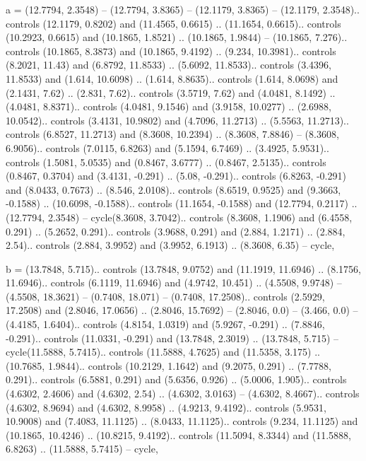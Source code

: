 a = {(12.7794, 2.3548) -- (12.7794, 3.8365) -- (12.1179, 3.8365) -- (12.1179, 2.3548).. controls (12.1179, 0.8202) and (11.4565, 0.6615) .. (11.1654, 0.6615).. controls (10.2923, 0.6615) and (10.1865, 1.8521) .. (10.1865, 1.9844) -- (10.1865, 7.276).. controls (10.1865, 8.3873) and (10.1865, 9.4192) .. (9.234, 10.3981).. controls (8.2021, 11.43) and (6.8792, 11.8533) .. (5.6092, 11.8533).. controls (3.4396, 11.8533) and (1.614, 10.6098) .. (1.614, 8.8635).. controls (1.614, 8.0698) and (2.1431, 7.62) .. (2.831, 7.62).. controls (3.5719, 7.62) and (4.0481, 8.1492) .. (4.0481, 8.8371).. controls (4.0481, 9.1546) and (3.9158, 10.0277) .. (2.6988, 10.0542).. controls (3.4131, 10.9802) and (4.7096, 11.2713) .. (5.5563, 11.2713).. controls (6.8527, 11.2713) and (8.3608, 10.2394) .. (8.3608, 7.8846) -- (8.3608, 6.9056).. controls (7.0115, 6.8263) and (5.1594, 6.7469) .. (3.4925, 5.9531).. controls (1.5081, 5.0535) and (0.8467, 3.6777) .. (0.8467, 2.5135).. controls (0.8467, 0.3704) and (3.4131, -0.291) .. (5.08, -0.291).. controls (6.8263, -0.291) and (8.0433, 0.7673) .. (8.546, 2.0108).. controls (8.6519, 0.9525) and (9.3663, -0.1588) .. (10.6098, -0.1588).. controls (11.1654, -0.1588) and (12.7794, 0.2117) .. (12.7794, 2.3548) -- cycle(8.3608, 3.7042).. controls (8.3608, 1.1906) and (6.4558, 0.291) .. (5.2652, 0.291).. controls (3.9688, 0.291) and (2.884, 1.2171) .. (2.884, 2.54).. controls (2.884, 3.9952) and (3.9952, 6.1913) .. (8.3608, 6.35) -- cycle},

b = {(13.7848, 5.715).. controls (13.7848, 9.0752) and (11.1919, 11.6946) .. (8.1756, 11.6946).. controls (6.1119, 11.6946) and (4.9742, 10.451) .. (4.5508, 9.9748) -- (4.5508, 18.3621) -- (0.7408, 18.071) -- (0.7408, 17.2508).. controls (2.5929, 17.2508) and (2.8046, 17.0656) .. (2.8046, 15.7692) -- (2.8046, 0.0) -- (3.466, 0.0) -- (4.4185, 1.6404).. controls (4.8154, 1.0319) and (5.9267, -0.291) .. (7.8846, -0.291).. controls (11.0331, -0.291) and (13.7848, 2.3019) .. (13.7848, 5.715) -- cycle(11.5888, 5.7415).. controls (11.5888, 4.7625) and (11.5358, 3.175) .. (10.7685, 1.9844).. controls (10.2129, 1.1642) and (9.2075, 0.291) .. (7.7788, 0.291).. controls (6.5881, 0.291) and (5.6356, 0.926) .. (5.0006, 1.905).. controls (4.6302, 2.4606) and (4.6302, 2.54) .. (4.6302, 3.0163) -- (4.6302, 8.4667).. controls (4.6302, 8.9694) and (4.6302, 8.9958) .. (4.9213, 9.4192).. controls (5.9531, 10.9008) and (7.4083, 11.1125) .. (8.0433, 11.1125).. controls (9.234, 11.1125) and (10.1865, 10.4246) .. (10.8215, 9.4192).. controls (11.5094, 8.3344) and (11.5888, 6.8263) .. (11.5888, 5.7415) -- cycle},

